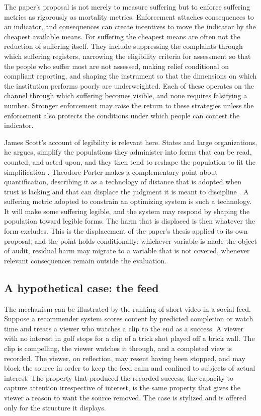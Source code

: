 \documentclass[11pt]{article}
\begin{document}
The paper's proposal is not merely to measure suffering but to enforce suffering metrics as rigorously as mortality metrics. Enforcement attaches consequences to an indicator, and consequences can create incentives to move the indicator by the cheapest available means. For suffering the cheapest means are often not the reduction of suffering itself. They include suppressing the complaints through which suffering registers, narrowing the eligibility criteria for assessment so that the people who suffer most are not assessed, making relief conditional on compliant reporting, and shaping the instrument so that the dimensions on which the institution performs poorly are underweighted. Each of these operates on the channel through which suffering becomes visible, and none requires falsifying a number. Stronger enforcement may raise the return to these strategies unless the enforcement also protects the conditions under which people can contest the indicator.

James Scott's account of legibility is relevant here. States and large organizations, he argues, simplify the populations they administer into forms that can be read, counted, and acted upon, and they then tend to reshape the population to fit the simplification \citep{scott1998}. Theodore Porter makes a complementary point about quantification, describing it as a technology of distance that is adopted when trust is lacking and that can displace the judgment it is meant to discipline \citep{porter1995}. A suffering metric adopted to constrain an optimizing system is such a technology. It will make some suffering legible, and the system may respond by shaping the population toward legible forms. The harm that is displaced is then whatever the form excludes. This is the displacement of the paper's thesis applied to its own proposal, and the point holds conditionally: whichever variable is made the object of audit, residual harm may migrate to a variable that is not covered, whenever relevant consequences remain outside the evaluation.

\subsection{A hypothetical case: the feed}

The mechanism can be illustrated by the ranking of short video in a social feed. Suppose a recommender system scores content by predicted completion or watch time and treats a viewer who watches a clip to the end as a success. A viewer with no interest in golf stops for a clip of a trick shot played off a brick wall. The clip is compelling, the viewer watches it through, and a completed view is recorded. The viewer, on reflection, may resent having been stopped, and may block the source in order to keep the feed calm and confined to subjects of actual interest. The property that produced the recorded success, the capacity to capture attention irrespective of interest, is the same property that gives the viewer a reason to want the source removed. The case is stylized and is offered only for the structure it displays.
\end{document}
